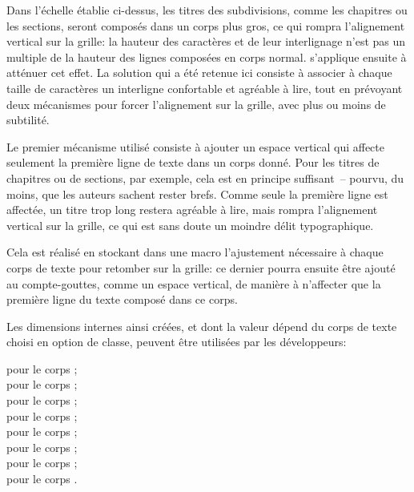 Dans l'échelle établie ci-dessus, les titres des subdivisions, comme les chapitres ou les sections, seront composés dans un corps plus gros, ce qui rompra l'alignement vertical sur la grille: la hauteur des caractères et de leur interlignage n'est pas un multiple de la hauteur des lignes composées en corps normal. \frenchlaw s'applique ensuite à atténuer cet effet. La solution qui a été retenue ici consiste à associer à chaque taille de caractères un interligne confortable et agréable à lire, tout en prévoyant deux mécanismes pour forcer l'alignement sur la grille, avec plus ou moins de subtilité.

Le premier mécanisme utilisé consiste à ajouter un espace vertical qui affecte seulement la première ligne de texte dans un corps donné. Pour les titres de chapitres ou de sections, par exemple, cela est en principe suffisant~-- pourvu, du moins, que les auteurs sachent rester brefs. Comme seule la première ligne est affectée, un titre trop long restera agréable à lire, mais rompra l'alignement vertical sur la grille, ce qui est sans doute un moindre délit typographique.

Cela est réalisé en stockant dans une macro l'ajustement nécessaire à chaque corps de texte pour retomber sur la grille: ce dernier pourra ensuite être ajouté au compte-gouttes, comme un espace vertical, de manière à n'affecter que la première ligne du texte composé dans ce corps.

\begin{developer}
Les dimensions internes ainsi créées, et dont la valeur dépend du corps de texte choisi en option de classe, peuvent être utilisées par les développeurs:

\noindent
{} pour le corps ;\\
 pour le corps ;\\
 pour le corps ;\\
 pour le corps ;\\
 pour le corps ;\\
 pour le corps ;\\
 pour le corps ;\\
 pour le corps .
\end{developer}

